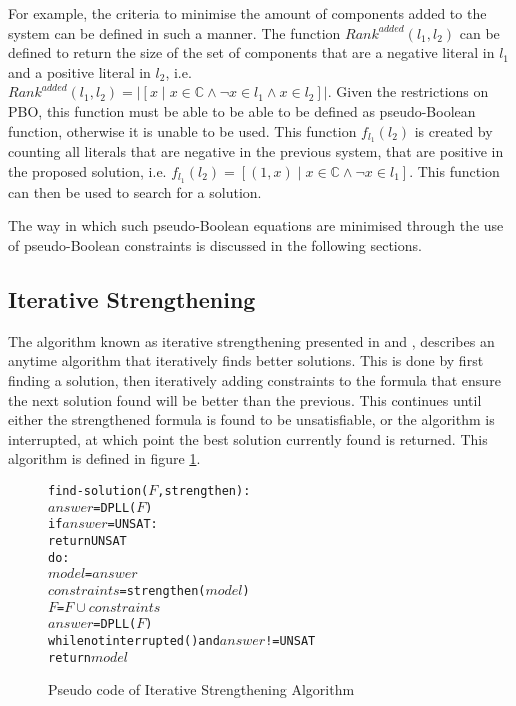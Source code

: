 For example, the criteria to minimise the amount of components added to the system can be defined in such a manner.
The function $Rank^{added}(l_1,l_2)$ can be defined to return the size of the set of components that are a negative literal in $l_1$ and a positive literal in $l_2$,
i.e. $Rank^{added}(l_1,l_2) = |[x \mid x \in \mathbb{C} \wedge \neg x \in l_1 \wedge x \in l_2]|$.
Given the restrictions on PBO, this function must be able to be able to be defined as pseudo-Boolean function, otherwise it is unable to be used.
This function $f_{l_1}(l_2)$ is created by counting all literals that are negative in the previous system, that are positive in the proposed solution,
i.e. $f_{l_1}(l_2) = [(1, x) \mid x \in \mathbb{C} \wedge \neg x \in l_1]$.
This function can then be used to search for a solution.

The way in which such pseudo-Boolean equations are minimised through the use of pseudo-Boolean constraints is discussed in the following sections. 


\subsection{Iterative Strengthening}
The algorithm known as iterative strengthening presented in \citep{calistri1994iterative} and \citep{le2010sat4j}, 
describes an anytime algorithm that iteratively finds better solutions.
This is done by first finding a solution, then iteratively adding constraints to the formula that ensure the next solution found will be better than the previous.
This continues until either the strengthened formula is found to be unsatisfiable, or the algorithm is interrupted, at which point the best solution currently found is returned. 
This algorithm is defined in figure \ref{impl.strength}.

\begin{figure}[htp]
\begin{center}
\begin{alltt}
find-solution(\(F\),strengthen):
    \(answer\) = DPLL(\(F\))
    if \(answer\) = UNSAT:
        return UNSAT
    do:
        \(model\) = \(answer\)
        \(constraints\) = strengthen(\(model\))
        \(F\) = \(F \cup constraints\)
        \(answer\) = DPLL(\(F\))
    while not interrupted() and \(answer\) != UNSAT
    return \(model\) 
\end{alltt}
  \caption{Pseudo code of Iterative Strengthening Algorithm}
  \label{impl.strength}
\end{center}
\end{figure}

